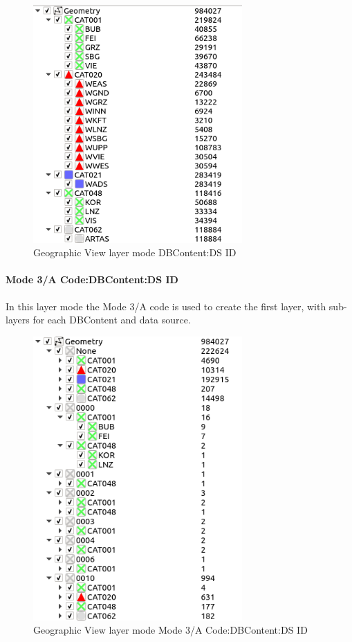 \begin{figure}[H]
    \center
    \includegraphics[width=8cm,frame]{figures/geoview_group_dbcont_ds.png}
  \caption{Geographic View layer mode DBContent:DS ID}
\end{figure}

\paragraph{Mode 3/A Code:DBContent:DS ID}

In this layer mode the Mode 3/A code is used to create the first layer, with sub-layers for each DBContent and data source.

\begin{figure}[H]
\center
    \includegraphics[width=8cm,frame]{figures/geoview_group_ma_dbcont.png}
  \caption{Geographic View layer mode Mode 3/A Code:DBContent:DS ID}
\end{figure}

